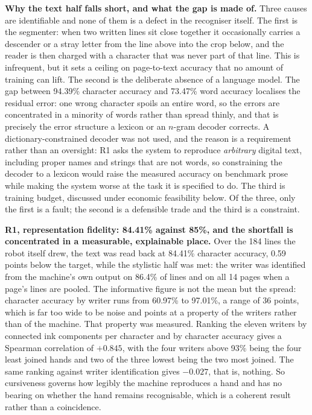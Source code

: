         \textbf{Why the text half falls short, and what the gap is made of.}
        Three causes are identifiable and none of them is a defect in the recogniser itself.
        The first is the segmenter: when two written lines sit close together it occasionally carries a descender or a stray letter from the line above into the crop below, and the reader is then charged with a character that was never part of that line.
        This is infrequent, but it sets a ceiling on page-to-text accuracy that no amount of training can lift.
        The second is the deliberate absence of a language model.
        The gap between 94.39\% character accuracy and 73.47\% word accuracy localises the residual error: one wrong character spoils an entire word, so the errors are concentrated in a minority of words rather than spread thinly, and that is precisely the error structure a lexicon or an $n$-gram decoder corrects.
        A dictionary-constrained decoder was not used, and the reason is a requirement rather than an oversight: R1 asks the system to reproduce \emph{arbitrary} digital text, including proper names and strings that are not words, so constraining the decoder to a lexicon would raise the measured accuracy on benchmark prose while making the system worse at the task it is specified to do.
        The third is training budget, discussed under economic feasibility below.
        Of the three, only the first is a fault; the second is a defensible trade and the third is a constraint.

        \textbf{R1, representation fidelity: 84.41\% against 85\%, and the shortfall is concentrated in a measurable, explainable place.}
        Over the 184 lines the robot itself drew, the text was read back at 84.41\% character accuracy, 0.59 points below the target, while the stylistic half was met: the writer was identified from the machine's own output on 86.4\% of lines and on all 14 pages when a page's lines are pooled.
        The informative figure is not the mean but the spread: character accuracy by writer runs from 60.97\% to 97.01\%, a range of 36 points, which is far too wide to be noise and points at a property of the writers rather than of the machine.
        That property was measured. Ranking the eleven writers by connected ink components per character and by character accuracy gives a Spearman correlation of $+0.845$, with the four writers above 93\% being the four least joined hands and two of the three lowest being the two most joined.
        The same ranking against writer identification gives $-0.027$, that is, nothing.
        So cursiveness governs how legibly the machine reproduces a hand and has no bearing on whether the hand remains recognisable, which is a coherent result rather than a coincidence.

